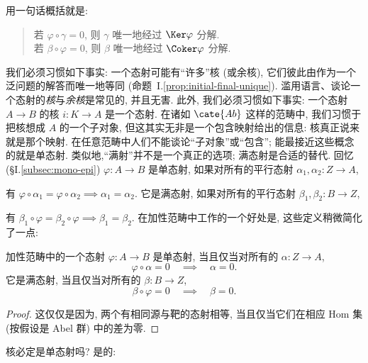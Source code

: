 \indent 用一句话概括就是:
\begin{quote}
若 $\varphi\circ\gamma=0$, 则 $\gamma$ 唯一地经过 $\Ker\varphi$ 分解.\\
若 $\beta\circ\varphi=0$, 则 $\beta$ 唯一地经过 $\Coker\varphi$ 分解.
\end{quote}
\indent 我们必须习惯如下事实: 一个态射可能有``许多''核 (或余核), 它们彼此由作为一个泛问题的解答而唯一地等同 (命题~I.\ref{prop:initial-final-unique}). 滥用语言、谈论一个态射的\emph{核}与\emph{余核}是常见的, 并且无害. 此外, 我们必须习惯如下事实: 一个态射 $A\to B$ 的核 $i:K\to A$ 是一个态射. 在诸如 $\cate{Ab}$ 这样的范畴中, 我们习惯于把核想成 $A$ 的一个子对象, 但这其实无非是一个包含映射给出的信息: 核真正说来就是那个映射. 在任意范畴中人们不能谈论``子对象''或``包含''; 能最接近这些概念的就是单态射. 类似地,``满射''并不是一个真正的选项; 满态射是合适的替代. 回忆 (§I.\ref{subsec:mono-epi}) $\varphi:A\to B$ 是单态射, 如果对所有的平行态射 $\alpha_1,\alpha_2:Z\to A$,
\begin{center}
\end{center}
有 $\varphi\circ\alpha_1=\varphi\circ\alpha_2\implies\alpha_1=\alpha_2$. 它是满态射, 如果对所有的平行态射 $\beta_1,\beta_2:B\to Z$,
\begin{center}
\end{center}
有 $\beta_1\circ\varphi=\beta_2\circ\varphi\implies\beta_1=\beta_2$. 在加性范畴中工作的一个好处是, 这些定义稍微简化了一点:

\begin{lemma}\label{lem:mono-epi-additive}
加性范畴中的一个态射 $\varphi:A\to B$ 是单态射, 当且仅当对所有的 $\alpha:Z\to A$,
\[
\varphi\circ\alpha=0\quad\implies\quad\alpha=0.
\]
它是满态射, 当且仅当对所有的 $\beta:B\to Z$,
\[
\beta\circ\varphi=0\quad\implies\quad\beta=0.
\]
\end{lemma}

\begin{proof}
这仅仅是因为, 两个有相同源与靶的态射相等, 当且仅当它们在相应 Hom 集 (按假设是 Abel 群) 中的差为零.
\end{proof}

\indent 核必定是单态射吗? 是的:

